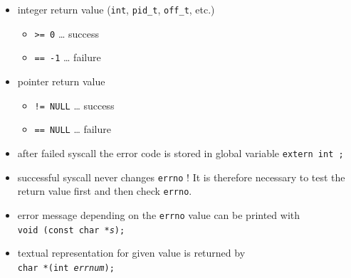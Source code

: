 \begin{slide}
\setlength{\baselineskip}{0.8\baselineskip}
\begin{itemize}
\item integer return value (\texttt{int}, \texttt{pid\_t},
\texttt{off\_t}, etc.)
    \begin{itemize}
    \item \texttt{>= 0} \dots{} success
    \item \texttt{== -1} \dots{} failure
    \end{itemize}
\item pointer return value
    \begin{itemize}
    \item \texttt{!= NULL} \dots{} success
    \item \texttt{== NULL} \dots{} failure
    \end{itemize}
\item after failed syscall the error code is stored in global variable
\texttt{extern int ;}
\item successful syscall never changes \texttt{errno} ! It is therefore
necessary to test the return value first and then check \texttt{errno}.
\item error message depending on the \texttt{errno} value can be printed with\\
\texttt{void (const char *\emph{s});}
\item textual representation for given value is returned by\\
\texttt{char *(int \emph{errnum});}
\end{itemize}
\end{slide}


